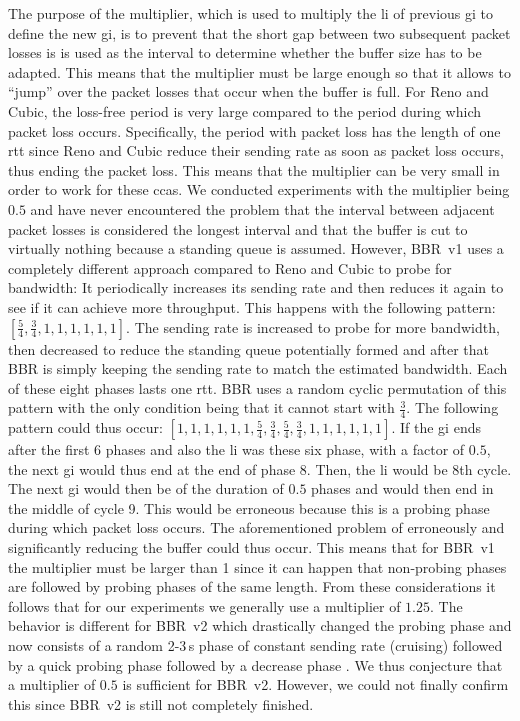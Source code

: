 \documentclass[10pt,sigconf,letterpaper,dvipsnames\ifx\removeHeaders\tempYes ,nonacm\fi]{acmart}
\begin{document}
The purpose of the multiplier, which is used to multiply the \gls{li} of previous \gls{gi} to define the new \gls{gi}, is to prevent that the short gap between two subsequent packet losses is is used as the interval to determine whether the buffer size has to be adapted. This means that the multiplier must be large enough so that it allows to ``jump'' over the packet losses that occur when the buffer is full. For Reno and Cubic, the loss-free period is very large compared to the period during which packet loss occurs. Specifically, the period with packet loss has the length of one \gls{rtt} since Reno and Cubic reduce their sending rate as soon as packet loss occurs, thus ending the packet loss. This means that the multiplier can be very small in order to work for these \glspl{cca}. We conducted experiments with the multiplier being $0.5$ and have never encountered the problem that the interval between adjacent packet losses is considered the longest interval and that the buffer is cut to virtually nothing because a standing queue is assumed. However, BBR~v1 uses a completely different approach compared to Reno and Cubic to probe for bandwidth: It periodically increases its sending rate and then reduces it again to see if it can achieve more throughput. This happens with the following pattern: $[\frac{5}{4},\frac{3}{4},1,1,1,1,1,1]$. The sending rate is increased to probe for more bandwidth, then decreased to reduce the standing queue potentially formed and after that BBR is simply keeping the sending rate to match the estimated bandwidth. Each of these eight phases lasts one \gls{rtt}. BBR uses a random cyclic permutation of this pattern with the only condition being that it cannot start with $\frac{3}{4}$. The following pattern could thus occur: $[1,1,1,1,1,1,\frac{5}{4},\frac{3}{4},\frac{5}{4},\frac{3}{4},1,1,1,1,1,1]$. If the \gls{gi} ends after the first 6 phases and also the \gls{li} was these six phase, with a factor of $0.5$, the next \gls{gi} would thus end at the end of phase 8. Then, the \gls{li} would be 8th cycle. The next \gls{gi} would then be of the duration of $0.5$ phases and would then end in the middle of cycle 9. This would be erroneous because this is a probing phase during which packet loss occurs. The aforementioned problem of erroneously and significantly reducing the buffer could thus occur. This means that for BBR~v1 the multiplier must be larger than 1 since it can happen that non-probing phases are followed by probing phases of the same length. From these considerations it follows that for our experiments we generally use a multiplier of $1.25$. The behavior is different for BBR~v2 which drastically changed the probing phase and now consists of a random 2-3\,s phase of constant sending rate (cruising) followed by a quick probing phase followed by a decrease phase \cite{cardwell_bbr_2019-1,cardwell_bbr_2019}. We thus conjecture that a multiplier of $0.5$ is sufficient for BBR~v2. However, we could not finally confirm this since BBR~v2 is still not completely finished. 
\end{document}
